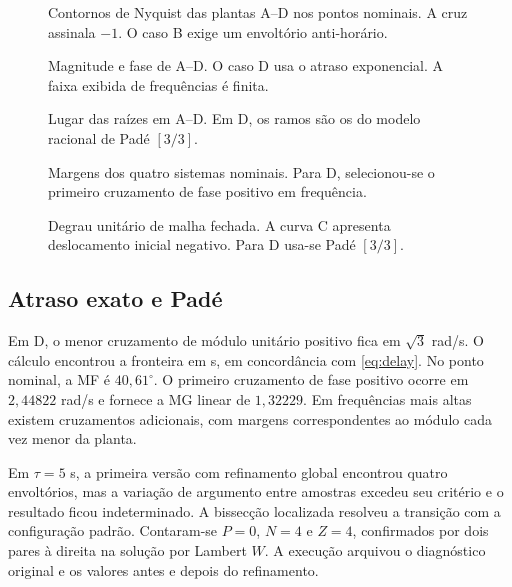 \begin{figure}[!t]
\centering
{}
\caption{Contornos de Nyquist das plantas A--D nos pontos nominais.
A cruz assinala $-1$. O caso B exige um envoltório anti-horário.}
\label{fig:nyquist}
\end{figure}

\begin{figure}[!t]
\centering
{}
\caption{Magnitude e fase de A--D. O caso D usa o atraso exponencial.
A faixa exibida de frequências é finita.}
\label{fig:bode}
\end{figure}

\begin{figure}[!t]
\centering
{}
\caption{Lugar das raízes em A--D. Em D, os ramos são os
do modelo racional de Padé $[3/3]$.}
\label{fig:locus}
\end{figure}

\begin{figure}[!t]
\centering
{}
\caption{Margens dos quatro sistemas nominais. Para D,
selecionou-se o primeiro cruzamento de fase positivo em frequência.}
\label{fig:margins}
\end{figure}

\begin{figure}[!t]
\centering
{}
\caption{Degrau unitário de malha fechada. A curva C apresenta
deslocamento inicial negativo. Para D usa-se Padé $[3/3]$.}
\label{fig:step}
\end{figure}

\subsection{Atraso exato e Padé}
Em D, o menor cruzamento de módulo unitário positivo fica em
$\sqrt3$ rad/s. O cálculo encontrou a fronteira em
\DelayCritical{} s, em concordância com \eqref{eq:delay}.
No ponto nominal, a MF é $40{,}61^\circ$. O primeiro cruzamento
de fase positivo ocorre em $2{,}44822$ rad/s e fornece a MG
linear de $1{,}32229$. Em frequências mais altas existem
cruzamentos adicionais, com margens correspondentes ao módulo
cada vez menor da planta.

Em $\tau=5$ s, a primeira versão com refinamento global
encontrou quatro envoltórios, mas a variação de argumento
entre amostras excedeu seu critério e o resultado ficou
indeterminado. A bissecção localizada resolveu a transição
com a configuração padrão. Contaram-se $P=0$, $N=4$ e
$Z=4$, confirmados por dois pares à direita na solução por
Lambert $W$. A execução arquivou o diagnóstico original e
os valores antes e depois do refinamento.

